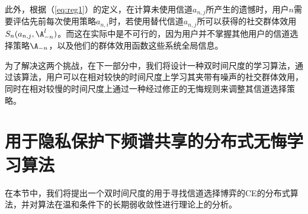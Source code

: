 此外，根据（\ref{eq:reg1}）的定义，在计算未使用信道$a_{n,j}$所产生的遗憾时，用户$n$需要评估先前每次使用策略$a_{n,i}$时，若使用替代信道$a_{n,j}$所可以获得的社交群体效用$S_n(a_{n,j},\A^l_{-n})$。而这在实际中是不可行的，因为用户并不掌握其他用户的信道选择策略$\A_{-n}$，以及他们的群体效用函数这些系统全局信息。


为了解决这两个挑战，在下一部分中，我们将设计一种双时间尺度的学习算法，通过该算法，用户可以在相对较快的时间尺度上学习其夹带有噪声的社交群体效用，同时在相对较慢的时间尺度上通过一种经过修正的无悔规则来调整其信道选择策略。

\section{用于隐私保护下频谱共享的分布式无悔学习算法}\label{sec:algorithm}
在本节中，我们将提出一个双时间尺度的用于寻找信道选择博弈的CE的分布式算法，并对算法在温和条件下的长期弱收敛性进行理论上的分析。

\vspace{-0.2cm}

